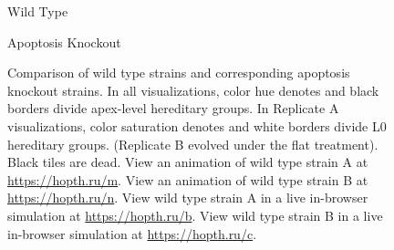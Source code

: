 \begin{figure}[!htbp]
\begin{center}
\vspace{1.0ex}

\hspace*{\fill}%
\begin{minipage}[t]{0.05\columnwidth}
\vspace{0pt} %
\end{minipage}%
\hfill
\begin{minipage}[t]{0.45\columnwidth}
\centering
\vspace{0pt} %
Wild Type
\end{minipage}%
\hfill
\begin{minipage}[t]{0.45\columnwidth}
\centering
\vspace{0pt} %
Apoptosis Knockout
\end{minipage}%
\hspace*{\fill}

\caption{
Comparison of wild type strains and corresponding apoptosis knockout strains.
In all visualizations, color hue denotes and black borders divide apex-level hereditary groups.
In Replicate A visualizations, color saturation denotes and white borders divide L0 hereditary groups.
(Replicate B evolved under the flat treatment).
Black tiles are dead.
View an animation of wild type strain A at \url{https://hopth.ru/m}.
View an animation of wild type strain B at \url{https://hopth.ru/n}.
View wild type strain A in a live in-browser simulation at \url{https://hopth.ru/b}.
View wild type strain B in a live in-browser simulation at \url{https://hopth.ru/c}.
}
\label{fig:ko-apoptosis}
\end{center}
\end{figure}
